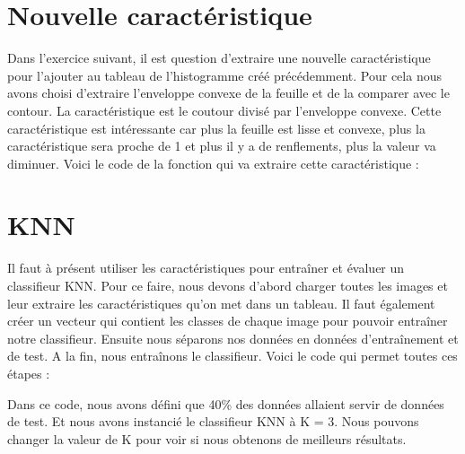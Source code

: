 \section{Nouvelle caractéristique}

Dans l'exercice suivant, il est question d'extraire une nouvelle caractéristique pour l'ajouter au tableau de l'histogramme créé précédemment. Pour cela nous avons choisi d'extraire l'enveloppe convexe de la feuille et de la comparer avec le contour. La caractéristique est le coutour divisé par l'enveloppe convexe. Cette caractéristique est intéressante car plus la feuille est lisse et convexe, plus la caractéristique sera proche de 1 et plus il y a de renflements, plus la valeur va diminuer. Voici le code de la fonction qui va extraire cette caractéristique : 




\section{KNN}

Il faut à présent utiliser les caractéristiques pour entraîner et évaluer un classifieur KNN. Pour ce faire, nous devons d'abord charger toutes les images et leur extraire les caractéristiques qu'on met dans un tableau. Il faut également créer un vecteur qui contient les classes de chaque image pour pouvoir entraîner notre classifieur. Ensuite nous séparons nos données en données d'entraînement et de test. A la fin, nous entraînons le classifieur. Voici le code qui permet toutes ces étapes : 





Dans ce code, nous avons défini que 40\% des données allaient servir de données de test. Et nous avons instancié le classifieur KNN à K = 3. Nous pouvons changer la valeur de K pour voir si nous obtenons de meilleurs résultats.




